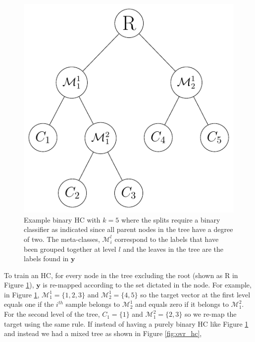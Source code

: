 \documentclass[../thesis.tex]{subfiles}
\begin{document}
\begin{figure}
    \centering
    \includegraphics{images/bin_hc.pdf}
    \caption[Example Binary Hierarchical Classifier]{Example binary HC with $k = 5$ where the splits require a binary classifier as indicated since all parent nodes in the tree have a degree of two. The meta-classes, $\mathcal{M}_i^l$ correspond to the labels that have been grouped together at level $l$ and the leaves in the tree are the labels found in $\mathbf{y}$}
    \label{fig:bin_hc}
\end{figure}

To train an HC, for every node in the tree excluding the root (shown as R in Figure \ref{fig:bin_hc}), $\mathbf{y}$ is re-mapped according to the set dictated in the node. For example, in Figure \ref{fig:bin_hc}, $\mathcal{M}_1^1 = \{1, 2, 3\}$ and $\mathcal{M}_2^1 = \{4, 5\}$ so the target vector at the first level equals one if the $i^{th}$ sample belongs to $\mathcal{M}_2^1$ and equals zero if it belongs to $\mathcal{M}_1^2$. For the second level of the tree, $C_1 = \{1\}$ and $\mathcal{M}_1^2 = \{2, 3\}$ so we re-map the target using the same rule. If instead of having a purely binary HC like Figure \ref{fig:bin_hc} and instead we had a mixed tree as shown in Figure \ref{fig:ovr_hc},
\end{document}
